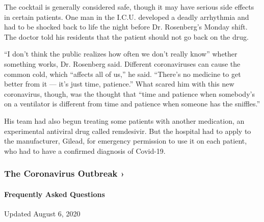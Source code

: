 The cocktail is generally considered safe, though it may have serious
side effects in certain patients. One man in the I.C.U. developed a
deadly arrhythmia and had to be shocked back to life the night before
Dr. Rosenberg's Monday shift. The doctor told his residents that the
patient should not go back on the drug.

``I don't think the public realizes how often we don't really know''
whether something works, Dr. Rosenberg said. Different coronaviruses can
cause the common cold, which ``affects all of us,'' he said. ``There's
no medicine to get better from it --- it's just time, patience.'' What
scared him with this new coronavirus, though, was the thought that
``time and patience when somebody's on a ventilator is different from
time and patience when someone has the sniffles.''

His team had also begun treating some patients with another medication,
an experimental antiviral drug called remdesivir. But the hospital had
to apply to the manufacturer, Gilead, for emergency permission to use it
on each patient, who had to have a confirmed diagnosis of Covid-19.

\href{https://www.nytimes.com/news-event/coronavirus?action=click\&pgtype=Article\&state=default\&region=MAIN_CONTENT_3\&context=storylines_faq}{}

\hypertarget{the-coronavirus-outbreak-}{%
\subsubsection{The Coronavirus Outbreak
›}\label{the-coronavirus-outbreak-}}

\hypertarget{frequently-asked-questions}{%
\paragraph{Frequently Asked
Questions}\label{frequently-asked-questions}}

Updated August 6, 2020

